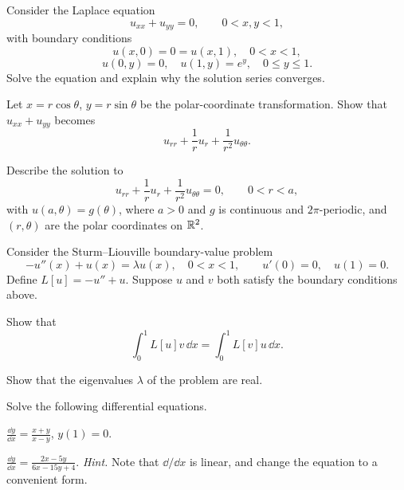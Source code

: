 \documentclass[11pt,oneside]{article}
\begin{document}
\begin{problem}
Consider the Laplace equation
\[u_{xx}+u_{yy}=0,\qquad 0<x,y<1,\]
with boundary conditions
\[u(x,0)=0=u(x,1),\quad 0<x<1,\]
\[u(0,y)=0,\quad u(1,y)=e^y,\quad 0\le y\le1.\]
Solve the equation and explain why the solution series converges.
\end{problem}

\begin{problem}
\begin{problemsubparts}
\item Let $x=r\cos\theta$, $y=r\sin\theta$ be the polar-coordinate transformation. Show that $u_{xx}+u_{yy}$ becomes
\[u_{rr}+\frac1r u_r+\frac1{r^2}u_{\theta\theta}.\]
\item Describe the solution to
\[u_{rr}+\frac1r u_r+\frac1{r^2}u_{\theta\theta}=0,\qquad 0<r<a,\]
with $u(a,\theta)=g(\theta)$, where $a>0$ and $g$ is continuous and $2\pi$-periodic, and $(r,\theta)$ are the polar coordinates on $\mathbb{R}^2$.
\end{problemsubparts}
\end{problem}

\begin{problem}
Consider the Sturm--Liouville boundary-value problem
\[-u''(x)+u(x)=\lambda u(x),\quad 0<x<1,\qquad u'(0)=0,\quad u(1)=0.\]
Define $L[u]=-u''+u$. Suppose $u$ and $v$ both satisfy the boundary conditions above.
\begin{problemsubparts}
\item Show that
\[\int_0^1 L[u]v\,\dd x=\int_0^1 L[v]u\,\dd x.\]
\item Show that the eigenvalues $\lambda$ of the problem are real.
\end{problemsubparts}
\end{problem}

\begin{problem}
Solve the following differential equations.
\begin{problemsubparts}
\item $\displaystyle\frac{\dd y}{\dd x}=\frac{x+y}{x-y}$, $y(1)=0$.
\item $\displaystyle\frac{\dd y}{\dd x}=\frac{2x-5y}{6x-15y+4}$. \textit{Hint.} Note that $\dd/\dd x$ is linear, and change the equation to a convenient form.
\end{problemsubparts}
\end{problem}
\end{document}
